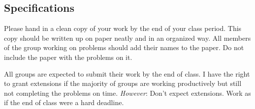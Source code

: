 \documentclass[11pt]{article}
\begin{document}
% 
% 
% 
% 
	
\subsection*{Specifications}

Please hand in a clean copy of your work by the end of your class period. This copy should be written up on paper neatly and in an organized way. All members of the group working on problems should add their names to the paper. Do not include the paper with the problems on it. 

All groups are expected to submit their work by the end of class. I have the right to grant extensions if the majority of groups are working productively but still not completing the problems on time. \emph{However}: Don't expect extensions. Work as if the end of class were a hard deadline. 
\end{document}
